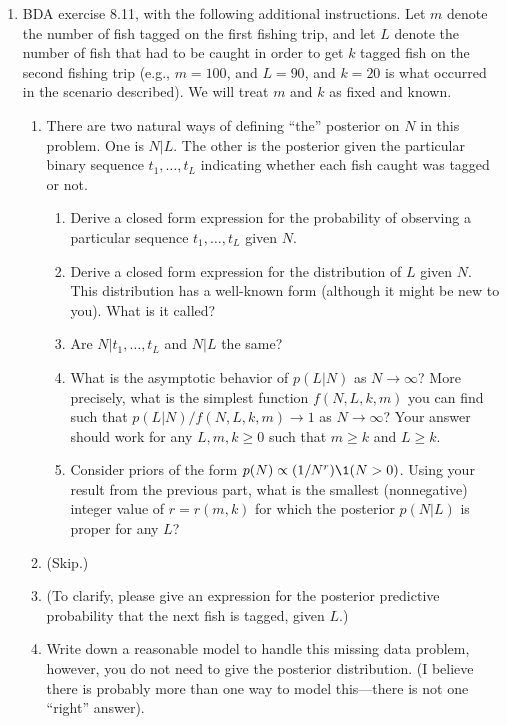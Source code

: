 \documentclass[12pt]{article}
\begin{document}
\begin{enumerate}
\item BDA exercise 8.11, with the following additional instructions. Let $m$ denote the number of fish tagged on the first fishing trip, and let $L$ denote the number of fish that had to be caught in order to get $k$ tagged fish on the second fishing trip (e.g., $m=100$, and $L = 90$, and $k=20$ is what occurred in the scenario described). We will treat $m$ and $k$ as fixed and known.
\begin{enumerate}
\item There are two natural ways of defining ``the'' posterior on $N$ in this problem. One is $N | L$. The other is the posterior given the particular binary sequence $t_1,\ldots,t_L$ indicating whether each fish caught was tagged or not. 
\begin{enumerate}
\item Derive a closed form expression for the probability of observing a particular sequence $t_1,\ldots,t_L$ given $N$.
\item Derive a closed form expression for the distribution of $L$ given $N$. This distribution has a well-known form (although it might be new to you). What is it called?
\item Are $N | t_1,\ldots,t_L$ and $N | L$ the same?
\item What is the asymptotic behavior of $p(L | N)$ as $N \to \infty$? More precisely, what is the simplest function $f(N,L,k,m)$ you can find such that $p(L|N)/f(N,L,k,m) \to 1$ as $N\to\infty$? Your answer should work for any $L,m,k\geq 0$ such that $m\geq k$ and $L\geq k$.
\item Consider priors of the form $p(N) \propto (1/N^r)\1(N>0)$. Using your result from the previous part, what is the smallest (nonnegative) integer value of $r = r(m,k)$ for which the posterior $p(N|L)$ is proper for any $L$?
\end{enumerate}
\item (Skip.)
\item (To clarify, please give an expression for the posterior predictive probability that the next fish is tagged, given $L$.)
\item Write down a reasonable model to handle this missing data problem, however, you do not need to give the posterior distribution. (I believe there is probably more than one way to model this---there is not one ``right'' answer).
\end{enumerate}


\end{enumerate}
\end{document}
